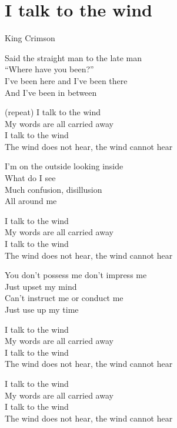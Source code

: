 \section{I talk to the wind}
\linespread{1.2}\selectfont
{\raggedleft King Crimson\par}
\begin{center}
Said the straight man to the late man\\
``Where have you been?''\\
I've been here and I've been there\\
And I've been in between
\medskip

(repeat) I talk to the wind\\
My words are all carried away\\
I talk to the wind\\
The wind does not hear, the wind cannot hear
\medskip

I'm on the outside looking inside\\
What do I see\\
Much confusion, disillusion\\
All around me
\medskip

I talk to the wind\\
My words are all carried away\\
I talk to the wind\\
The wind does not hear, the wind cannot hear
\medskip

You don't possess me don't impress me\\
Just upset my mind\\
Can't instruct me or conduct me\\
Just use up my time
\medskip

I talk to the wind\\
My words are all carried away\\
I talk to the wind\\
The wind does not hear, the wind cannot hear
\medskip

I talk to the wind\\
My words are all carried away\\
I talk to the wind\\
The wind does not hear, the wind cannot hear
\end{center}

\linespread{1.4}\selectfont